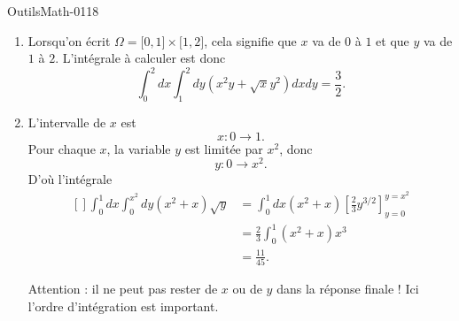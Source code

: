 
\begin{corrige}{OutilsMath-0118}

    \begin{enumerate}
        \item
            Lorsqu'on écrit \( \Omega=\mathopen[ 0 , 1 \mathclose]\times \mathopen[ 1 , 2 \mathclose]\), cela signifie que \( x\) va de \( 0\) à \( 1\) et que \( y\) va de \( 1\) à \( 2\). L'intégrale à calculer est donc
            \begin{equation}
                \int_0^2dx\int_1^2dy (x^2y+\sqrt{x}y^2)dxdy=\frac{ 3 }{2}.
            \end{equation}
        \item

            L'intervalle de \( x\) est
            \begin{equation}
                x\colon 0\to 1.
            \end{equation}
            Pour chaque \( x\), la variable \( y\) est limitée par \( x^2\), donc
            \begin{equation}
                y\colon 0\to x^2.
            \end{equation}
            D'où l'intégrale
            \begin{equation}
                \begin{aligned}[]
                    \int_0^1dx\int_0^{x^2}dy(x^2+x)\sqrt{y}&=\int_0^1dx(x^2+x)\left[ \frac{ 2 }{ 3 }y^{3/2} \right]_{y=0}^{y=x^2}\\
                    &=\frac{ 2 }{ 3 }\int_0^1(x^2+x)x^3\\
                    &=\frac{ 11 }{ 45 }.
                \end{aligned}
            \end{equation}

            Attention : il ne peut pas rester de \( x\) ou de \( y\) dans la réponse finale ! Ici l'ordre d'intégration est important.
            
    \end{enumerate}
    

\end{corrige}
